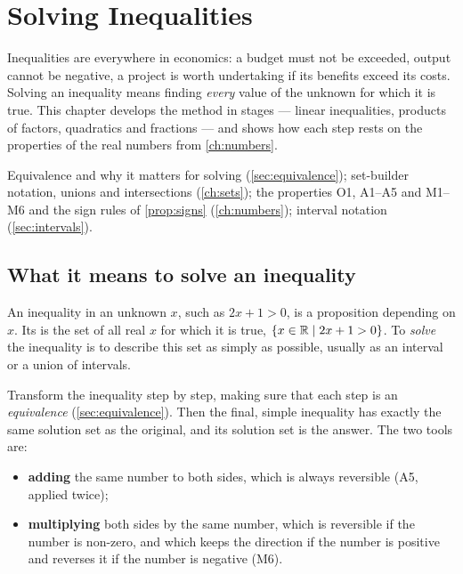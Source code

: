 \chapter{Solving Inequalities}\label{ch:ineq}

\begin{chapterintro}
Inequalities are everywhere in economics: a budget must not be exceeded, output cannot be negative, a
project is worth undertaking if its benefits exceed its costs. Solving an inequality means finding
\emph{every} value of the unknown for which it is true. This chapter develops the method in stages ---
linear inequalities, products of factors, quadratics and fractions --- and shows how each step rests on the
properties of the real numbers from \cref{ch:numbers}.
\end{chapterintro}

\begin{prerequisites}
Equivalence and why it matters for solving (\cref{sec:equivalence}); set-builder notation, unions and
intersections (\cref{ch:sets}); the properties O1, A1--A5 and M1--M6 and the sign rules of \cref{prop:signs}
(\cref{ch:numbers}); interval notation (\cref{sec:intervals}).
\end{prerequisites}

\section{What it means to solve an inequality}\label{sec:solve-meaning}

An inequality in an unknown $x$, such as $2x+1>0$, is a proposition depending on $x$. Its
 is the set of all real $x$ for which it is true, $\{x\in\mathbb{R}\mid 2x+1>0\}$. To
\emph{solve} the inequality is to describe this set as simply as possible, usually as an interval or a union of
intervals.

\begin{core}
Transform the inequality step by step, making sure that each step is an \emph{equivalence}
(\cref{sec:equivalence}). Then the final, simple inequality has exactly the same solution set as the
original, and its solution set is the answer. The two tools are:
\begin{itemize}
  \item \textbf{adding} the same number to both sides, which is always reversible (A5, applied twice);
  \item \textbf{multiplying} both sides by the same number, which is reversible if the number is
  non-zero, and which keeps the direction if the number is positive and reverses it if the number is
  negative (M6).
\end{itemize}
\end{core}

